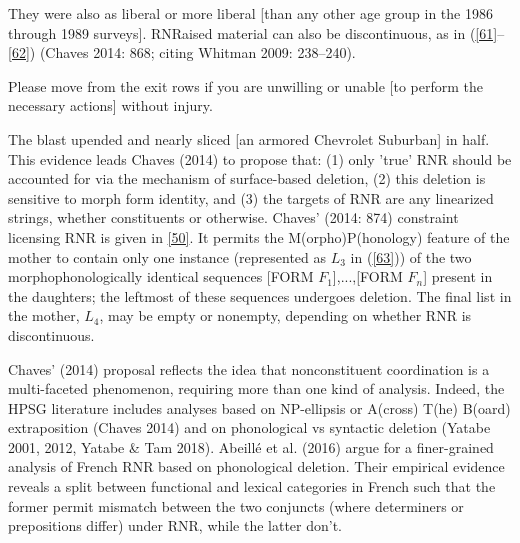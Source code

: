 \documentclass[output=paper]{langsci/langscibook}
\begin{document}
{\ea They were also as liberal or more liberal [than any other age group in the 1986 through 1989 surveys].\label{60}\z
RNRaised material can also be discontinuous, as in (\ref{61}--\ref{62}) (Chaves 2014: 868; citing Whitman 2009: 238--240).

\ea Please move from the exit rows if you are unwilling or unable [to perform the necessary actions] without injury.\label{61}\z

\ea The blast upended and nearly sliced [an armored Chevrolet Suburban] in half.\label{62}\z
This evidence leads Chaves (2014) to propose that: (1) only 'true' RNR should be accounted for via the mechanism of surface-based deletion, (2) this deletion is sensitive to morph form identity, and (3) the targets of RNR are any linearized strings, whether constituents or otherwise. Chaves' (2014: 874) constraint licensing RNR is given in \ref{50}. It permits the M(orpho)P(honology) feature of the mother to contain only one instance (represented as $L_{3}$ in (\ref{63})) of the two morphophonologically identical sequences [FORM $F_{1}$],...,[FORM $F_{n}$] present in the daughters; the leftmost of these sequences undergoes deletion. The final list in the mother, $L_{4}$, may be empty or nonempty, depending on whether RNR is discontinuous.


\z



Chaves' (2014) proposal reflects the idea that nonconstituent coordination is a multi-faceted phenomenon, requiring more than one kind of analysis. Indeed, the HPSG literature includes analyses based on NP-ellipsis or A(cross) T(he) B(oard) extraposition (Chaves 2014) and on phonological vs syntactic deletion (Yatabe 2001, 2012, Yatabe \& Tam 2018). Abeill\'{e} et al. (2016) argue for a finer-grained analysis of French RNR based on phonological deletion. Their empirical evidence reveals a split between functional and lexical categories in French such that the former permit mismatch between the two conjuncts (where determiners or prepositions differ) under RNR, while the latter don't.



}
\end{document}
